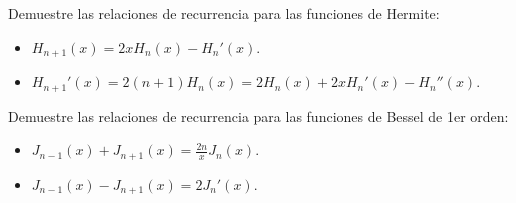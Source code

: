 \begin{ejercicio}
	Demuestre las relaciones de recurrencia para las funciones de Hermite:
	\begin{itemize}
		\item $H_{n + 1} (x) = 2xH_n (x) - H_n ' (x)$.
		\item $H_{n + 1} ' (x) = 2(n + 1) H_n (x) = 2H_n (x) + 2xH_n ' (x) - H_n '' (x)$.
	\end{itemize}
\end{ejercicio}













\begin{ejercicio}
	Demuestre las relaciones de recurrencia para las funciones de Bessel de 1er orden:
	\begin{itemize}
		\item $J_{n - 1} (x) + J_{n + 1} (x) = \frac{2n}{x} J_n (x)$.
		\item $J_{n - 1} (x) - J_{n + 1} (x) = 2J_n ' (x)$.
	\end{itemize}
\end{ejercicio}































